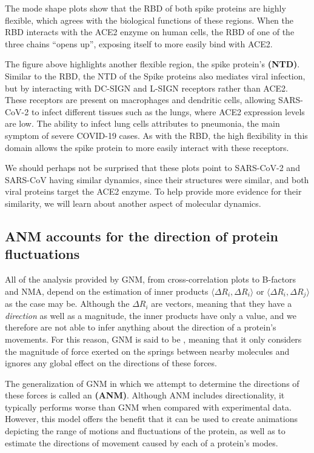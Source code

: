 The mode shape plots show that the RBD of both spike proteins are highly flexible, which agrees with the biological functions of these regions. When the RBD interacts with the ACE2 enzyme on human cells, the RBD of one of the three chains ``opens up'', exposing itself to more easily bind with ACE2.

The figure above highlights another flexible region, the spike protein's  \textbf{(NTD)}. Similar to the RBD, the NTD of the Spike proteins also mediates viral infection, but by interacting with DC-SIGN and L-SIGN receptors rather than ACE2. These receptors are present on macrophages and dendritic cells, allowing SARS-CoV-2 to infect different tissues such as the lungs, where ACE2 expression levels are low. The ability to infect lung cells attributes to pneumonia, the main symptom of severe COVID-19 cases. As with the RBD, the high flexibility in this domain allows the spike protein to more easily interact with these receptors.

We should perhaps not be surprised that these plots point to SARS-CoV-2 and SARS-CoV having similar dynamics, since their structures were similar, and both viral proteins target the ACE2 enzyme. To help provide more evidence for their similarity, we will learn about another aspect of molecular dynamics.

\FloatBarrier
{}
\subsection{ANM accounts for the direction of protein fluctuations}

All of the analysis provided by GNM, from cross-correlation plots to B-factors and NMA, depend on the estimation of inner products $ \langle \Delta R_i, \Delta R_i \rangle $ or $ \langle \Delta R_i, \Delta R_j \rangle $ as the case may be. Although the $ \Delta R_i $ are vectors, meaning that they have a \textit{direction} as well as a magnitude, the inner products have only a value, and we therefore are not able to infer anything about the direction of a protein's movements. For this reason, GNM is said to be , meaning that it only considers the magnitude of force exerted on the springs between nearby molecules and ignores any global effect on the directions of these forces.

The generalization of GNM in which we attempt to determine the directions of these forces is called an  \textbf{(ANM)}. Although ANM includes directionality, it typically performs worse than GNM when compared with experimental data. However, this model offers the benefit that it can be used to create animations depicting the range of motions and fluctuations of the protein, as well as to estimate the directions of movement caused by each of a protein's modes.

